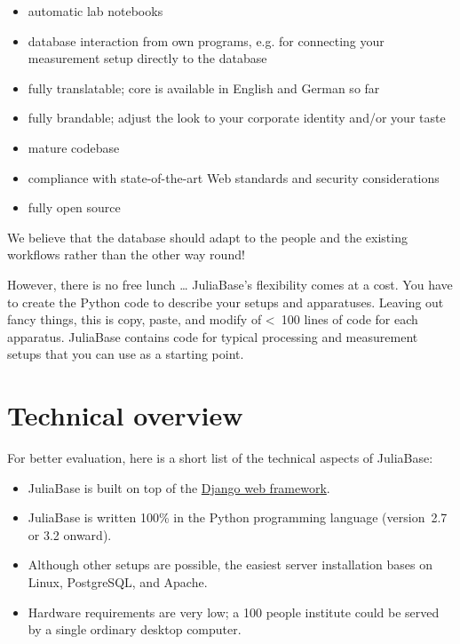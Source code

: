 \documentclass[a4paper,11pt,english]{sphinxmanual}
\begin{document}
\begin{itemize}
\item {} 
automatic lab notebooks

\item {} 
database interaction from own programs, e.g. for connecting your measurement
setup directly to the database

\item {} 
fully translatable; core is available in English and German so far

\item {} 
fully brandable; adjust the look to your corporate identity and/or your taste

\item {} 
mature codebase

\item {} 
compliance with state-of-the-art Web standards and security considerations

\item {} 
fully open source

\end{itemize}

We believe that the database should adapt to the people and the existing
workflows rather than the other way round!

However, there is no free lunch … JuliaBase's flexibility comes at a cost.  You
have to create the Python code to describe your setups and apparatuses.
Leaving out fancy things, this is copy, paste, and modify of \textless{} 100 lines of
code for each apparatus.  JuliaBase contains code for typical processing and
measurement setups that you can use as a starting point.


\section{Technical overview}
\label{index:technical-overview}
For better evaluation, here is a short list of the technical aspects of
JuliaBase:
\begin{itemize}
\item {} 
JuliaBase is built on top of the \href{https://www.djangoproject.com/}{Django web framework}.

\item {} 
JuliaBase is written 100\% in the Python programming language (version 2.7 or
3.2 onward).

\item {} 
Although other setups are possible, the easiest server installation bases on
Linux, PostgreSQL, and Apache.

\item {} 
Hardware requirements are very low; a 100 people institute could be served by
a single ordinary desktop computer.

\end{itemize}
\end{document}
